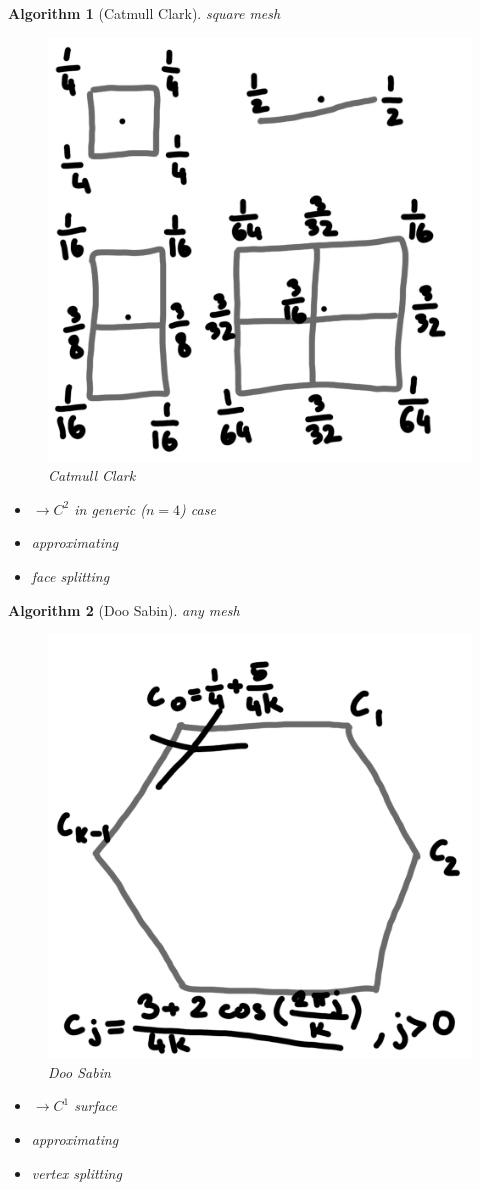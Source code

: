 \documentclass[conference]{IEEEtran}
\newtheorem{algorithm}{Algorithm}
\begin{document}
\begin{algorithm}[Catmull Clark]
	square mesh
	
	\begin{figure}[h!]
		\centering
		\includegraphics[width=0.5\linewidth]{figures/catmull_clark_short}
		\caption{Catmull Clark}
	\end{figure}
	
	\begin{itemize}
		\item $\rightarrow C^2$ in generic ($n=4$) case
		\item approximating
		\item face splitting
	\end{itemize}
\end{algorithm}

\begin{algorithm}[Doo Sabin]
	any mesh
	
	\begin{figure}[h!]
		\centering
		\includegraphics[width=0.5\linewidth]{figures/doo_sabin_short}
		\caption{Doo Sabin}
	\end{figure}
	
	\begin{itemize}
		\item $\rightarrow C^1$ surface
		\item approximating
		\item vertex splitting
	\end{itemize}
\end{algorithm}
\end{document}
